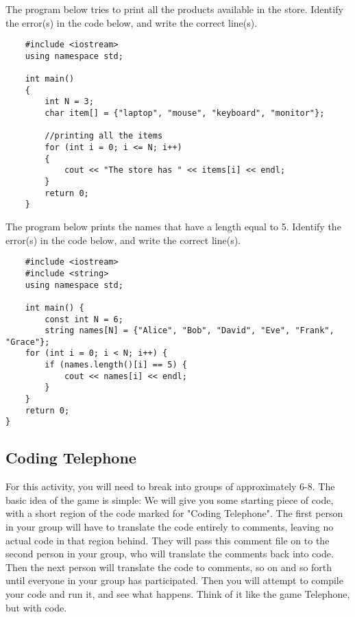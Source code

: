 \begin{multipart}
The program below tries to print all the products available in the store. Identify the error(s) in the code below, and write the correct line(s).
\end{multipart}

\begin{verbatim}
    #include <iostream>
    using namespace std;
    
    int main()
    {
        int N = 3;
        char item[] = {"laptop", "mouse", "keyboard", "monitor"};
    
        //printing all the items
        for (int i = 0; i <= N; i++)
        {
            cout << "The store has " << items[i] << endl;
        }
        return 0;
    }
\end{verbatim}

\begin{multipart}
The program below prints the names that have a length equal to 5. Identify the error(s) in the code below, and write the correct line(s).
\end{multipart}

\begin{verbatim}
    #include <iostream>
    #include <string>
    using namespace std;

    int main() {
        const int N = 6;
        string names[N] = {"Alice", "Bob", "David", "Eve", "Frank", "Grace"};
    for (int i = 0; i < N; i++) {
        if (names.length()[i] == 5) {
            cout << names[i] << endl;
        }
    }
    return 0;
}
\end{verbatim}

\subsection{Coding Telephone}

For this activity, you will need to break into groups of approximately 6-8. The basic idea of the game is simple: We will give you some starting piece of code, with a short region of the code marked for "Coding Telephone". The first person in your group will have to translate the code entirely to comments, leaving no actual code in that region behind. They will pass this comment file on to the second person in your group, who will translate the comments back into code. Then the next person will translate the code to comments, so on and so forth until everyone in your group has participated. Then you will attempt to compile your code and run it, and see what happens. Think of it like the game Telephone, but with code.

